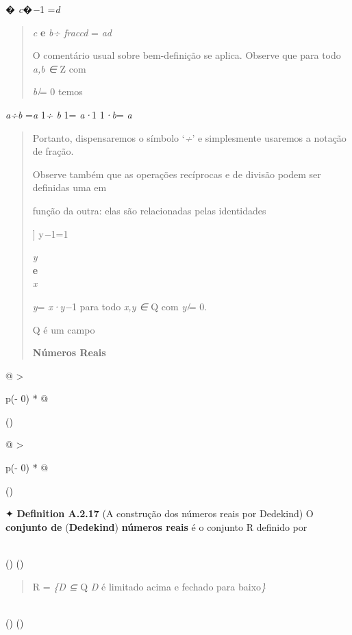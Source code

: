 \documentclass[
]{article}
\begin{document}
� \emph{c}�\emph{−}1 =\emph{d}

\begin{quote}
\emph{c} \textbf{e} \emph{b÷ fraccd} = \emph{ad}

O comentário usual sobre bem-definição se aplica. Observe que para todo
\emph{a,b ∈} Z com

\emph{b ̸}= 0 temos
\end{quote}

\emph{a÷b} =\emph{a} 1\emph{÷ b} 1= \emph{a·}1 1\emph{·b}= \emph{a}

\begin{quote}
Portanto, dispensaremos o símbolo `\emph{÷}' e simplesmente usaremos a
notação de fração.

Observe também que as operações recíprocas e de divisão podem ser
definidas uma em

função da outra: elas são relacionadas pelas identidades

{]} y\emph{−}1=1

\emph{y}\\
\textbf{e}\\
\emph{x}

\emph{y}= \emph{x·y−}1 para todo \emph{x,y ∈} Q com \emph{y ̸}= 0.

Q é um campo

\textbf{Números Reais}
\end{quote}

\begin{longtable}[]{@{}
  >{\raggedright\arraybackslash}p{(\columnwidth - 0\tabcolsep) * }@{}}
\toprule()
\begin{minipage}[b]{\linewidth}\raggedright
\begin{longtable}[]{@{}
  >{\raggedright\arraybackslash}p{(\columnwidth - 0\tabcolsep) * }@{}}
\toprule()
\begin{minipage}[b]{\linewidth}\raggedright
✦ \textbf{Definition A.2.17} (A construção dos números reais por
Dedekind) O \textbf{conjunto de} (\textbf{Dedekind}) \textbf{números
reais} é o conjunto R definido por
\end{minipage} \\
\midrule()
\endhead
\bottomrule()
\end{longtable}

\begin{quote}
R = \emph{\{D ⊆} Q \emph{\textbar{} D} é limitado acima e fechado para
baixo\emph{\}}
\end{quote}
\end{minipage} \\
\midrule()
\endhead
\bottomrule()
\end{longtable}
\end{document}
